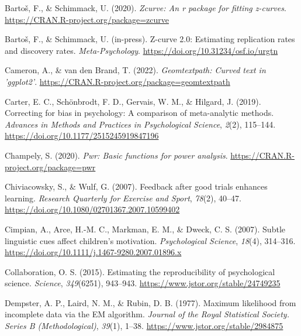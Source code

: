 \documentclass[
  doc, donotrepeattitle,floatsintext]{apa7}
\newlength{\cslhangindent}
\newlength{\cslentryspacingunit} %
\newenvironment{CSLReferences}[2] %
 {%
  \setlength{\parindent}{0pt}
  \ifodd #1
  \let\oldpar\par
  \def\par{\hangindent=\cslhangindent\oldpar}
  \fi
  \setlength{\parskip}{#2\cslentryspacingunit}
 }%
 {}
\begin{document}
\begin{CSLReferences}{1}{0}
\leavevmode{}%
Bartoš, F., \& Schimmack, U. (2020). \emph{Zcurve: An r package for fitting z-curves}. \url{https://CRAN.R-project.org/package=zcurve}

\leavevmode{}%
Bartoš, F., \& Schimmack, U. (in-press). Z-curve 2.0: Estimating replication rates and discovery rates. \emph{Meta-Psychology}. \url{https://doi.org/10.31234/osf.io/urgtn}

\leavevmode{}%
Cameron, A., \& van den Brand, T. (2022). \emph{Geomtextpath: Curved text in 'ggplot2'}. \url{https://CRAN.R-project.org/package=geomtextpath}

\leavevmode{}%
Carter, E. C., Schönbrodt, F. D., Gervais, W. M., \& Hilgard, J. (2019). Correcting for bias in psychology: A comparison of meta-analytic methods. \emph{Advances in Methods and Practices in Psychological Science}, \emph{2}(2), 115--144. \url{https://doi.org/10.1177/2515245919847196}

\leavevmode{}%
Champely, S. (2020). \emph{Pwr: Basic functions for power analysis}. \url{https://CRAN.R-project.org/package=pwr}

\leavevmode{}%
Chiviacowsky, S., \& Wulf, G. (2007). Feedback after good trials enhances learning. \emph{Research Quarterly for Exercise and Sport}, \emph{78}(2), 40--47. \url{https://doi.org/10.1080/02701367.2007.10599402}

\leavevmode{}%
Cimpian, A., Arce, H.-M. C., Markman, E. M., \& Dweck, C. S. (2007). Subtle linguistic cues affect children's motivation. \emph{Psychological Science}, \emph{18}(4), 314--316. \url{https://doi.org/10.1111/j.1467-9280.2007.01896.x}

\leavevmode{}%
Collaboration, O. S. (2015). Estimating the reproducibility of psychological science. \emph{Science}, \emph{349}(6251), 943--943. \url{https://www.jstor.org/stable/24749235}

\leavevmode{}%
Dempster, A. P., Laird, N. M., \& Rubin, D. B. (1977). Maximum likelihood from incomplete data via the {EM} algorithm. \emph{Journal of the Royal Statistical Society. Series B (Methodological)}, \emph{39}(1), 1--38. \url{https://www.jstor.org/stable/2984875}


\end{CSLReferences}
\end{document}

